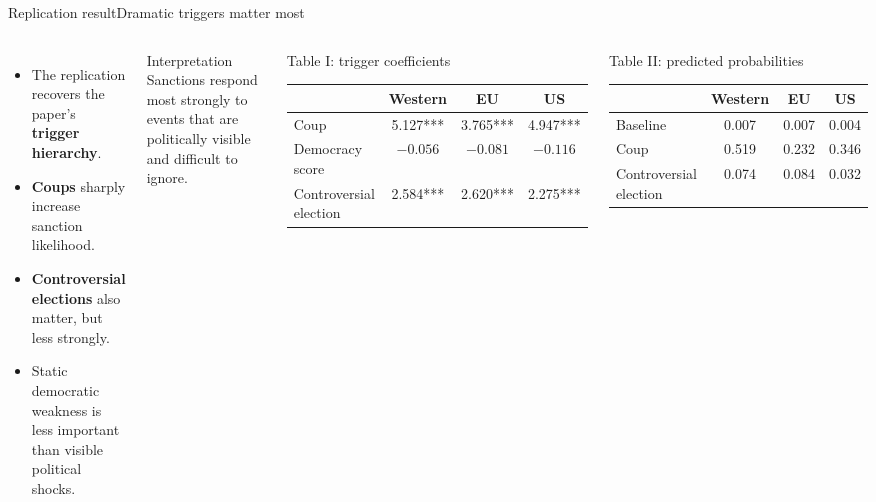 \documentclass[
11pt,notheorems,hyperref={pdfauthor=Jakob}
]{beamer}
\begin{document}
	\begin{frame}{Replication result}{Dramatic triggers matter most}
		\begin{columns}[T,onlytextwidth]
			\begin{itemize}
				\item The replication recovers the paper's \textbf{trigger hierarchy}.
				\item \textbf{Coups} sharply increase sanction likelihood.
				\item \textbf{Controversial elections} also matter, but less strongly.
				\item Static democratic weakness is less important than visible political shocks.
			\end{itemize}
			
			\vspace{0.4em}
			\begin{block}{Interpretation}
				Sanctions respond most strongly to events that are politically visible and difficult to ignore.
			\end{block}
			
			\begin{block}{\centering \footnotesize Table I: trigger coefficients}
				\centering
				\scriptsize
				\begin{tabular}{lccc}
					\hline
					& Western & EU & US \\
					\hline
					Coup & 5.127*** & 3.765*** & 4.947*** \\
					Democracy score & $-0.056$ & $-0.081$ & $-0.116$ \\
					Controversial election & 2.584*** & 2.620*** & 2.275*** \\
					\hline
				\end{tabular}
			\end{block}
			
			\vspace{0.3em}
			
			\begin{block}{\centering \footnotesize Table II: predicted probabilities}
				\centering
				\scriptsize
				\begin{tabular}{lccc}
					\hline
					& Western & EU & US \\
					\hline
					Baseline & 0.007 & 0.007 & 0.004 \\
					Coup & 0.519 & 0.232 & 0.346 \\
					Controversial election & 0.074 & 0.084 & 0.032 \\
					\hline
				\end{tabular}
			\end{block}
		\end{columns}
	\end{frame}
	
\end{document}
